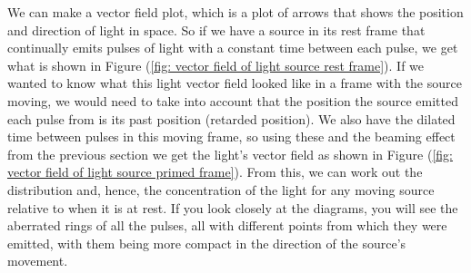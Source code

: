 We can make a vector field plot, which is a plot of arrows that shows the position and direction of light in space.
So if we have a source in its rest frame that continually emits pulses of light with a constant time between each pulse, we get what is shown in Figure (\ref{fig: vector field of light source rest frame}).
If we wanted to know what this light vector field looked like in a frame with the source moving, we would need to take into account that the position the source emitted each pulse from is its past position (retarded position).
We also have the dilated time between pulses in this moving frame, so using these and the beaming effect from the previous section we get the light's vector field as shown in Figure (\ref{fig: vector field of light source primed frame}).
From this, we can work out the distribution and, hence, the concentration of the light for any moving source relative to when it is at rest.
If you look closely at the diagrams, you will see the aberrated rings of all the pulses, all with different points from which they were emitted, with them being more compact in the direction of the source's movement.

